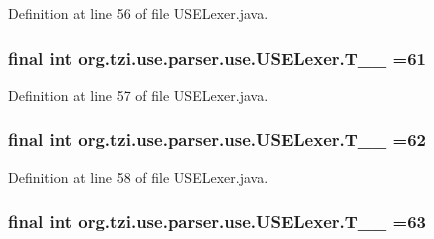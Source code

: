 Definition at line 56 of file U\-S\-E\-Lexer.\-java.

\hypertarget{classorg_1_1tzi_1_1use_1_1parser_1_1use_1_1_u_s_e_lexer_a45d05e51045646ff2714b7285559a55a}{
\subsubsection[{T\-\_\-\-\_\-61}]{\setlength{\rightskip}{0pt plus 5cm}final int org.\-tzi.\-use.\-parser.\-use.\-U\-S\-E\-Lexer.\-T\-\_\-\-\_ =61\hspace{0.3cm}{\ttfamily [static]}}}\label{classorg_1_1tzi_1_1use_1_1parser_1_1use_1_1_u_s_e_lexer_a45d05e51045646ff2714b7285559a55a}


Definition at line 57 of file U\-S\-E\-Lexer.\-java.

\hypertarget{classorg_1_1tzi_1_1use_1_1parser_1_1use_1_1_u_s_e_lexer_afdbe6fd04cd9481e7d197726e61b9871}{
\subsubsection[{T\-\_\-\-\_\-62}]{\setlength{\rightskip}{0pt plus 5cm}final int org.\-tzi.\-use.\-parser.\-use.\-U\-S\-E\-Lexer.\-T\-\_\-\-\_ =62\hspace{0.3cm}{\ttfamily [static]}}}\label{classorg_1_1tzi_1_1use_1_1parser_1_1use_1_1_u_s_e_lexer_afdbe6fd04cd9481e7d197726e61b9871}


Definition at line 58 of file U\-S\-E\-Lexer.\-java.

\hypertarget{classorg_1_1tzi_1_1use_1_1parser_1_1use_1_1_u_s_e_lexer_a890cefbe5ae7a2d433ad9abeac57a8cb}{
\subsubsection[{T\-\_\-\-\_\-63}]{\setlength{\rightskip}{0pt plus 5cm}final int org.\-tzi.\-use.\-parser.\-use.\-U\-S\-E\-Lexer.\-T\-\_\-\-\_ =63\hspace{0.3cm}{\ttfamily [static]}}}\label{classorg_1_1tzi_1_1use_1_1parser_1_1use_1_1_u_s_e_lexer_a890cefbe5ae7a2d433ad9abeac57a8cb}


